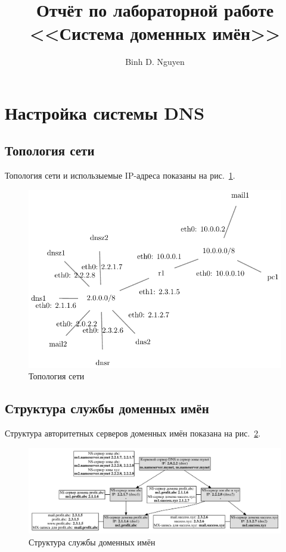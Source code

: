 \documentclass[a4paper,12pt]{article}
\title{Отчёт по лабораторной работе \\ <<Система доменных имён>>}
\author{Binh D. Nguyen}
\begin{document}
\maketitle

\tableofcontents

\section{Настройка системы DNS}

\subsection{Топология сети}

Топология сети и использыемые IP-адреса показаны на рис.~\ref{fig:network}.

\begin{figure}
\centering
\includegraphics[width=\textwidth]{includes/network_gv.pdf}
\caption{Топология сети}
\label{fig:network}
\end{figure}

\subsection{Структура службы доменных имён}

Структура авторитетных серверов доменных имён показана на рис.~\ref{fig:dns}.

\begin{figure}
\centering
\includegraphics[width=\textwidth]{includes/dns_gv.pdf}
\caption{Структура службы доменных имён}
\label{fig:dns}
\end{figure}
\end{document}
